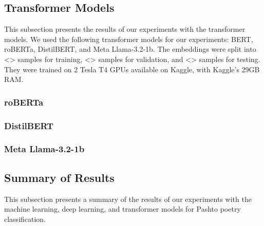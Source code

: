 \subsection{Transformer Models}

This subsection presents the results of our experiments with the transformer models. We used the following transformer models for our experiments: BERT, roBERTa, DistilBERT, and Meta Llama-3.2-1b. The embeddings were split into <> samples for training, <> samples for validation, and <> samples for testing. They were trained on 2 Tesla T4 GPUs available on Kaggle, with Kaggle's 29GB RAM.

\subsubsection{roBERTa}

\subsubsection{DistilBERT}

\subsubsection{Meta Llama-3.2-1b}


\subsection{Summary of Results}

This subsection presents a summary of the results of our experiments with the machine learning, deep learning, and transformer models for Pashto poetry classification.


